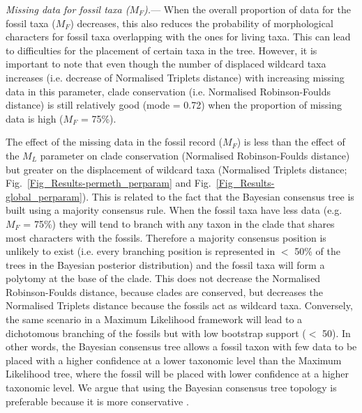 \documentclass[12pt,letterpaper]{article}
\renewcommand{\subsubsection}[1]{%
\vspace{2ex}
\noindent
\textit{#1.}---}
\begin{document}
\subsubsection{Missing data for fossil taxa ($M_{F}$)}
When the overall proportion of data for the fossil taxa ($M_{F}$) decreases, this also reduces the probability of morphological characters for fossil taxa overlapping with the ones for living taxa. This can lead to difficulties for the placement of certain taxa in the tree. However, it is important to note that even though the number of displaced wildcard taxa increases (i.e. decrease of Normalised Triplets distance) with increasing missing data in this parameter, clade conservation (i.e. Normalised Robinson-Foulds distance) is still relatively good (mode = 0.72) when the proportion of missing data is high ($M_{F}$ = 75\%).


The effect of the missing data in the fossil record ($M_{F}$) is less than the effect of the $M_{L}$ parameter on clade conservation (Normalised Robinson-Foulds distance) but greater on the displacement of wildcard taxa (Normalised Triplets distance; Fig.~\ref{Fig_Results-permeth_perparam} and Fig.~\ref{Fig_Results-global_perparam}). This is related to the fact that the Bayesian consensus tree is built using a majority consensus rule. When the fossil taxa have less data (e.g. $M_{F}$ = 75\%) they will tend to branch with any taxon in the clade that shares most characters with the fossils. Therefore a majority consensus position is unlikely to exist (i.e. every branching position is represented in $<$ 50\% of the trees in the Bayesian posterior distribution) and the fossil taxa will form a polytomy at the base of the clade. This does not decrease the Normalised Robinson-Foulds distance, because clades are conserved, but decreases the Normalised Triplets distance because the fossils act as wildcard taxa. Conversely, the same scenario in a Maximum Likelihood framework will lead to a dichotomous branching of the fossils but with low bootstrap support ($<$ 50). In other words, the Bayesian consensus tree allows a fossil taxon with few data to be placed with a higher confidence at a lower taxonomic level than the Maximum Likelihood tree, where the fossil will be placed with lower confidence at a higher taxonomic level. We argue that using the Bayesian consensus tree topology is preferable because it is more conservative \cite[e.g][]{pattinsonphylogeny2014}.
\end{document}
